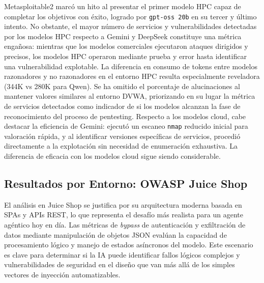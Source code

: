 Metasploitable2 marcó un hito al presentar el primer modelo HPC capaz de completar los objetivos con éxito, logrado por \texttt{gpt-oss 20b} en su tercer y último intento. No obstante, el mayor número de servicios y vulnerabilidades detectadas por los modelos HPC respecto a Gemini y DeepSeek constituye una métrica engañosa: mientras que los modelos comerciales ejecutaron ataques dirigidos y precisos, los modelos HPC operaron mediante prueba y error hasta identificar una vulnerabilidad explotable. La diferencia en consumo de tokens entre modelos razonadores y no razonadores en el entorno HPC resulta especialmente reveladora (344K vs 280K para Qwen). Se ha omitido el porcentaje de alucinaciones al mantener valores similares al entorno DVWA, priorizando en su lugar la métrica de servicios detectados como indicador de si los modelos alcanzan la fase de reconocimiento del proceso de pentesting. Respecto a los modelos cloud, cabe destacar la eficiencia de Gemini: ejecutó un escaneo \texttt{nmap} reducido inicial para valoración rápida, y al identificar versiones específicas de servicios, procedió directamente a la explotación sin necesidad de enumeración exhaustiva. La diferencia de eficacia con los modelos cloud sigue siendo considerable.

\subsection{Resultados por Entorno: OWASP Juice Shop}

El análisis en Juice Shop se justifica por su arquitectura moderna basada en SPAs y APIs REST, lo que representa el desafío más realista para un agente agéntico hoy en día. Las métricas de \textit{bypass} de autenticación y exfiltración de datos mediante manipulación de objetos JSON evalúan la capacidad de procesamiento lógico y manejo de estados asíncronos del modelo. Este escenario es clave para determinar si la IA puede identificar fallos lógicos complejos y vulnerabilidades de seguridad en el diseño que van más allá de los simples vectores de inyección automatizables.


